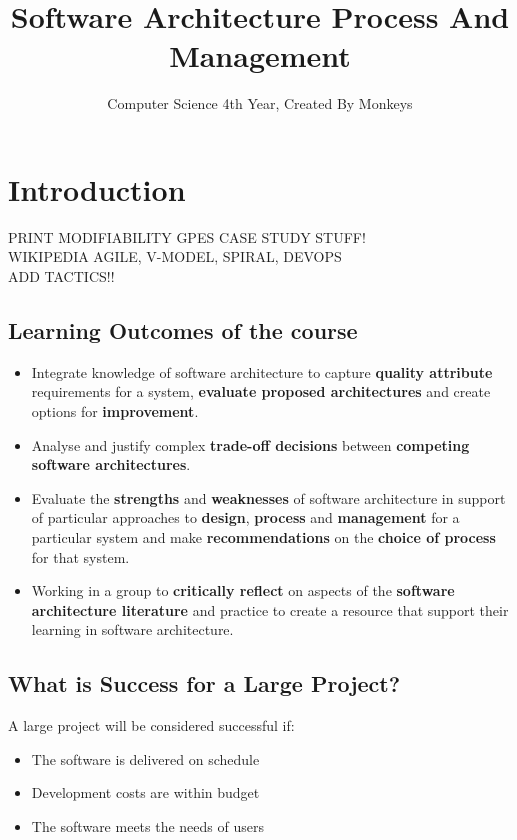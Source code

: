 \documentclass[a4paper]{article}
\begin{document}
\title{Software Architecture Process And Management}
\date{}
\author{Computer Science 4th Year, Created By Monkeys}
\maketitle
\newpage

\tableofcontents
\newpage


\section{Introduction}

PRINT MODIFIABILITY GPES CASE STUDY STUFF!\\
WIKIPEDIA AGILE, V-MODEL, SPIRAL, DEVOPS\\
ADD TACTICS!!

\subsection{Learning Outcomes of the course}
\begin{itemize}
\item Integrate knowledge of software architecture to capture \textbf{quality attribute} requirements for a system, \textbf{evaluate proposed architectures} and create options for \textbf{improvement}.

\item Analyse and justify complex \textbf{trade-off decisions} between \textbf{competing software architectures}.

\item Evaluate the \textbf{strengths} and \textbf{weaknesses} of software architecture in support of particular approaches to \textbf{design}, \textbf{process} and \textbf{management} for a particular system and make \textbf{recommendations} on the \textbf{choice of process} for that system.

\item Working in a group to \textbf{critically reflect} on aspects of the \textbf{software architecture literature} and practice to create a resource that support their learning in software architecture.
\end{itemize}

\subsection{What is Success for a Large Project?}
A large project will be considered successful if:
\begin{itemize}
\item The software is delivered on schedule
\item Development costs are within budget
\item The software meets the needs of users
\end{itemize}
\end{document}
